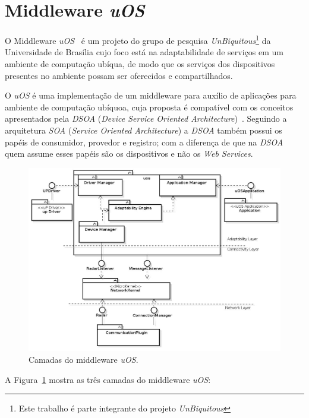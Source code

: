 \section{Middleware \textit{uOS}}
\label{uos}

	O Middleware \textit{uOS}~\cite{fabriciobuzzeto} é um projeto do grupo de pesquisa \textit{UnBiquitous}\footnote{Este trabalho é parte integrante do projeto \textit{UnBiquitous}} da Universidade de Brasília cujo foco está na adaptabilidade de serviços em um ambiente de computação ubíqua, de modo que os serviços dos dispositivos presentes no ambiente possam ser oferecidos e compartilhados.

	 O \textit{uOS} é uma implementação de um middleware para auxílio de aplicações para ambiente de computação ubíquoa, cuja proposta é compatível com os conceitos apresentados pela \textit{DSOA} (\textit{Device Service Oriented Architecture})~\cite{fabriciobuzzeto}. Seguindo a arquitetura \textit{SOA} (\textit{Service Oriented Architecture}) a \textit{DSOA} também possui os papéis de consumidor, provedor e registro; com a diferença de que na \textit{DSOA} quem assume esses papéis são os dispositivos e não os \textit{Web Services}.

	 \begin{figure}[htb]
		\begin{center}
			\includegraphics[scale=0.45]{figuras/4.ProblemaEProposta/uoscamadas.jpg}
		\end{center}
		\caption{Camadas do middleware \textit{uOS}.}
		\label{fig:arq-uos}
	\end{figure}

	A Figura~\ref{fig:arq-uos} mostra as três camadas do middleware \textit{uOS}:


